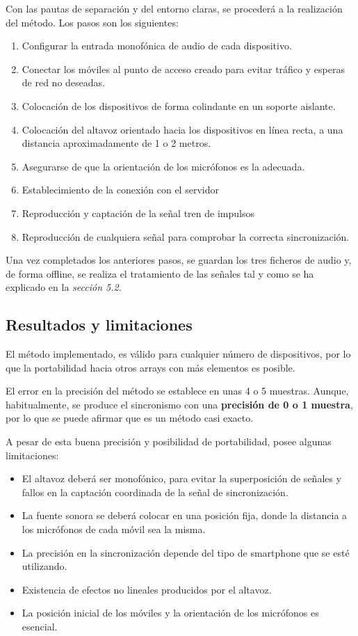 \documentclass[a4paper,11pt]{book}
\begin{document}
Con las pautas de separación y del entorno claras, se procederá a la realización del método. Los pasos son los siguientes:
\begin{enumerate}
\item Configurar la entrada monofónica de audio de cada dispositivo.
\item Conectar los móviles al punto de acceso creado para evitar tráfico y esperas de red no deseadas.
\item Colocación de los dispositivos de forma colindante en un soporte aislante.
\item Colocación del altavoz orientado hacia los dispositivos en línea recta, a una distancia aproximadamente de 1 o 2 metros.
\item Asegurarse de que la orientación de los micrófonos es la adecuada.
\item Establecimiento de la conexión con el servidor
\item Reproducción y captación de la señal tren de impulsos
\item Reproducción de cualquiera señal para comprobar la correcta sincronización.
\end{enumerate}

Una vez completados los anteriores pasos, se guardan los tres ficheros de audio y, de forma offline, se realiza el tratamiento de las señales tal y como se ha explicado en la \textit{sección 5.2}.


\subsection{Resultados y limitaciones}

El método implementado, es válido para cualquier número de dispositivos, por lo que la portabilidad hacia otros arrays con más elementos es posible.

El error en la precisión del método se establece en unas 4 o 5 muestras. Aunque, habitualmente, se produce el sincronismo con una \textbf{precisión de 0 o 1 muestra}, por lo que se puede afirmar que es un método casi exacto.

A pesar de esta buena precisión y posibilidad de portabilidad, posee algunas limitaciones:

\begin{itemize}
\item El altavoz deberá ser monofónico, para evitar la superposición de señales y fallos en la captación coordinada de la señal de sincronización.
\item La fuente sonora se deberá colocar en una posición fija, donde la distancia a los micrófonos de cada móvil sea la misma.
\item La precisión en la sincronización depende del tipo de smartphone que se esté utilizando.
\item Existencia de efectos no lineales producidos por el altavoz.
\item La posición inicial de los móviles y la orientación de los micrófonos es esencial.
\end{itemize}
\end{document}
